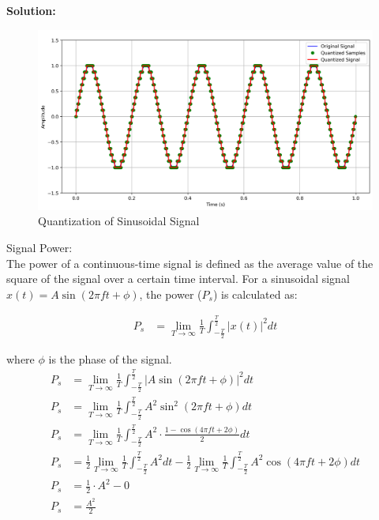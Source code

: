 \documentclass[journal,12pt,onecolumn]{IEEEtran}
\begin{document}
\textbf{Solution:}
\begin{table}[H]

\label{table:Gate.31.2023.0}
\end{table}
\begin{figure}[H]
  \centering
  \includegraphics[width=1\textwidth]{Graph/a.png}
  \caption{Quantization of Sinusoidal Signal}
  \label{fig:Gate.31.2023.1}
\end{figure}
\enumerate
\item Signal Power: \\
The power of a continuous-time signal is defined as the average value of the square of the signal over a certain time interval. For a sinusoidal signal \(x(t) = A \sin(2\pi f t + \phi)\), the power (\(P_s\)) is calculated as:

\begin{align}
P_s &= \lim_{{T \to \infty}} \frac{1}{T} \int_{{-\frac{T}{2}}}^{{\frac{T}{2}}} |x(t)|^2 dt
\end{align}

where \(\phi\) is the phase of the signal.
\begin{align}
P_s &= \lim_{{T \to \infty}} \frac{1}{T} \int_{{-\frac{T}{2}}}^{{\frac{T}{2}}} |A \sin(2\pi f t + \phi)|^2 dt\\
P_s &= \lim_{{T \to \infty}} \frac{1}{T} \int_{{-\frac{T}{2}}}^{{\frac{T}{2}}} A^2 \sin^2(2\pi f t + \phi) dt\\
P_s &= \lim_{{T \to \infty}} \frac{1}{T} \int_{{-\frac{T}{2}}}^{{\frac{T}{2}}} A^2 \cdot \frac{1 - \cos(4\pi f t + 2\phi)}{2} dt\\
P_s &= \frac{1}{2} \lim_{{T \to \infty}} \frac{1}{T} \int_{{-\frac{T}{2}}}^{{\frac{T}{2}}} A^2 dt - \frac{1}{2} \lim_{{T \to \infty}} \frac{1}{T} \int_{{-\frac{T}{2}}}^{{\frac{T}{2}}} A^2 \cos(4\pi f t + 2\phi) dt\\
P_s &= \frac{1}{2} \cdot A^2 - 0\\
P_s &= \frac{A^2}{2}\\
\end{align}
\end{document}
